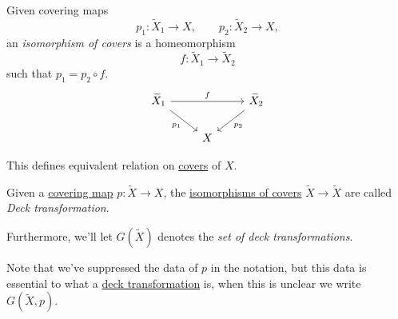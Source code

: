 \begin{definition}\label{def:isomorphism-of-covers}
	Given covering maps
	\[
		p_1\colon \widetilde{X} _1\to X,\qquad p_2\colon \widetilde{X} _2\to X,
	\]
	an \emph{isomorphism of covers} is a homeomorphism
	\[
		f\colon \widetilde{X} _1\to \widetilde{X} _2
	\]
	such that \(p_1 = p_2\circ f\).
	\[\begin{tikzcd}
			{\widetilde{X}_1} && {\widetilde{X}_2} \\
			& X
			\arrow["{p_1}"', from=1-1, to=2-2]
			\arrow["{p_2}", from=1-3, to=2-2]
			\arrow["f", from=1-1, to=1-3]
		\end{tikzcd}\]
\end{definition}

\begin{exercise}
	This defines equivalent relation on \hyperref[def:isomorphism-of-covers]{covers} of \(X\).
\end{exercise}

\begin{definition}\label{def:deck-transformation}
	Given a \hyperref[def:covering-map]{covering map} \(p\colon \widetilde{X} \to X\), the  \hyperref[def:isomorphism-of-covers]{isomorphisms of covers}
	\(\widetilde{X} \to \widetilde{X} \) are called \emph{Deck transformation}.

	\par Furthermore, we'll let \(G(\widetilde{X} )\) denotes the \emph{set of deck transformations}.
\end{definition}
\begin{note}
	Note that we've suppressed the data of \(p\) in the notation, but this data is essential to what a \hyperref[def:deck-transformation]{deck transformation}
	is, when this is unclear we write \(G(\widetilde{X} , p)\).
\end{note}